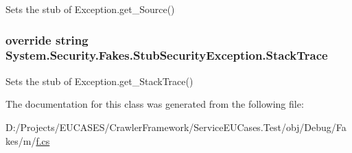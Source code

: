 Sets the stub of Exception.\-get\-\_\-\-Source()

\hypertarget{class_system_1_1_security_1_1_fakes_1_1_stub_security_exception_a35190467928a6a0d4c89fb51708a0569}{
\subsubsection[{Stack\-Trace}]{\setlength{\rightskip}{0pt plus 5cm}override string System.\-Security.\-Fakes.\-Stub\-Security\-Exception.\-Stack\-Trace\hspace{0.3cm}{\ttfamily [get]}}}\label{class_system_1_1_security_1_1_fakes_1_1_stub_security_exception_a35190467928a6a0d4c89fb51708a0569}


Sets the stub of Exception.\-get\-\_\-\-Stack\-Trace()



The documentation for this class was generated from the following file\-:\begin{DoxyCompactItemize}
\item 
D\-:/\-Projects/\-E\-U\-C\-A\-S\-E\-S/\-Crawler\-Framework/\-Service\-E\-U\-Cases.\-Test/obj/\-Debug/\-Fakes/m/\hyperlink{m_2f_8cs}{f.\-cs}\end{DoxyCompactItemize}
